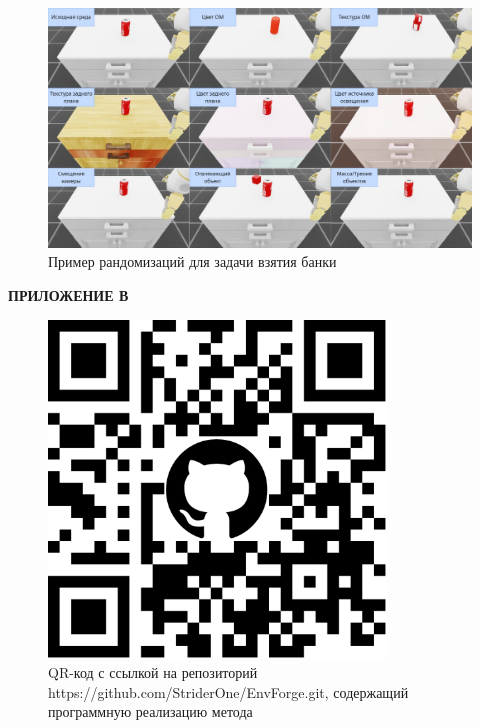 \begin{figure}[h]
  \begin{center}
      \includegraphics[width=\textwidth]{images/Randomizations.jpg}
  \caption{Пример рандомизаций для задачи взятия банки}
  \end{center}
\end{figure}

\clearpage
\newpage
\begin{center}
  \textbf{\large ПРИЛОЖЕНИЕ В}
\end{center}
\label{sec:program}

\begin{figure}[h]
  \begin{center}
      \includegraphics[width=0.8\textwidth]{images/463b52fd-5ec1-41eb-a46c-899e347383db.png}
  \caption{QR-код с ссылкой на репозиторий https://github.com/StriderOne/EnvForge.git, содержащий программную реализацию метода}
  \label{fig:arch}
  \end{center}
\end{figure}
